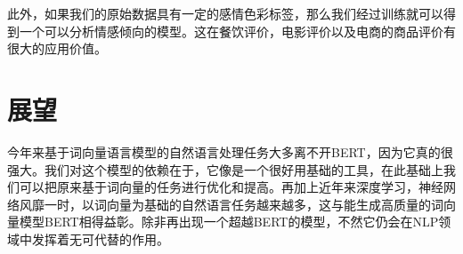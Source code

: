 \documentclass[]{article}
\begin{document}
此外，如果我们的原始数据具有一定的感情色彩标签，那么我们经过训练就可以得到一个可以分析情感倾向的模型。这在餐饮评价，电影评价以及电商的商品评价有很大的应用价值。

\section{展望}
今年来基于词向量语言模型的自然语言处理任务大多离不开BERT，因为它真的很强大。我们对这个模型的依赖在于，它像是一个很好用基础的工具，在此基础上我们可以把原来基于词向量的任务进行优化和提高。再加上近年来深度学习，神经网络风靡一时，以词向量为基础的自然语言任务越来越多，这与能生成高质量的词向量模型BERT相得益彰。除非再出现一个超越BERT的模型，不然它仍会在NLP领域中发挥着无可代替的作用。

\newpage
\end{document}
